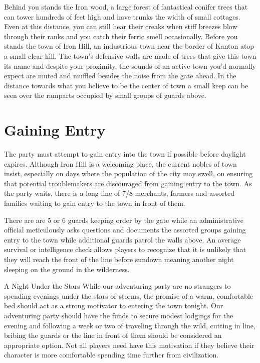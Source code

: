 \documentclass[letterpaper,twocolumn,openany,nodeprecatedcode]{dndbook}
\begin{document}
\begin{DndReadAloud}
Behind you stands the Iron wood, a large forest of fantastical conifer trees that can tower hundreds of feet high and have trunks the width of small cottages. Even at this distance, you can still hear their creaks when stiff breezes blow through their ranks and you catch their ferric smell occasionally. Before you stands the town of Iron Hill, an industrious town near the border of Kanton atop a small clear hill. The town's defensive walls are made of trees that give this town its name and despite your proximity, the sounds of an active town you'd normally expect are muted and muffled besides the noise from the gate ahead. In the distance towards what you believe to be the center of town a small keep can be seen over the ramparts occupied by small groups of guards above.
\end{DndReadAloud}

\section{Gaining Entry} 
The party must attempt to gain entry into the town if possible before daylight expires. Although Iron Hill is a welcoming place, the current nobles of town insist, especially on days where the population of the city may swell, on ensuring that potential troublemakers are discouraged from gaining entry to the town. As the party waits, there is a long line of 7/8 merchants, farmers and assorted families waiting to gain entry to the town in front of them. 

There are are 5 or 6 guards keeping order by the gate while an administrative official meticulously asks questions and documents the assorted groups gaining entry to the town while additional guards patrol the walls above. An average survival or intelligence check allows players to recognize that it is unlikely that they will reach the front of the line before sundown meaning another night sleeping on the ground in the wilderness.
\begin{DndSidebar}[float=!h]{A Night Under the Stars}
While our adventuring party are no strangers to spending evenings under the stars or storms, the promise of a warm, comfortable bed should act as a strong motivator to entering the town tonight. Our adventuring party should have the funds to secure modest lodgings for the evening and following a week or two of traveling through the wild, cutting in line, bribing the guards or the line in front of them should be considered an appropriate option. Not all players need have this motivation if they believe their character is more comfortable spending time further from civilization.
\end{DndSidebar}
\end{document}
